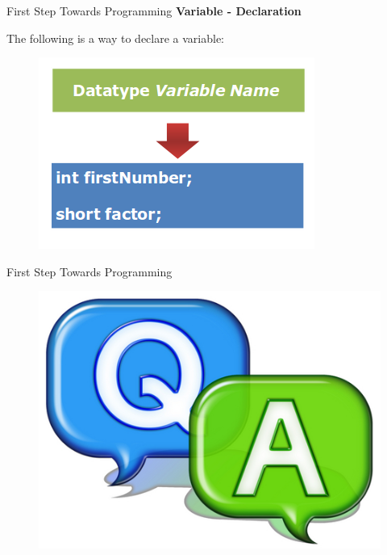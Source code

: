 \documentclass[14pt]{beamer}
\begin{document}
\begin{frame}{First Step Towards Programming}
 \textbf{Variable - Declaration}
 
 The following is a way to declare a variable: 
 \begin{figure}[H]
\begin{center}
 \includegraphics[scale=.4]{variable-declaration.png}
\end{center}
\end{figure} 
\end{frame}

\begin{frame}{First Step Towards Programming}
 \begin{figure}[H]
 \begin{center}
   \includegraphics[scale=.5]{qa.png}   
 \end{center}
  \end{figure}
\end{frame}
\end{document}
